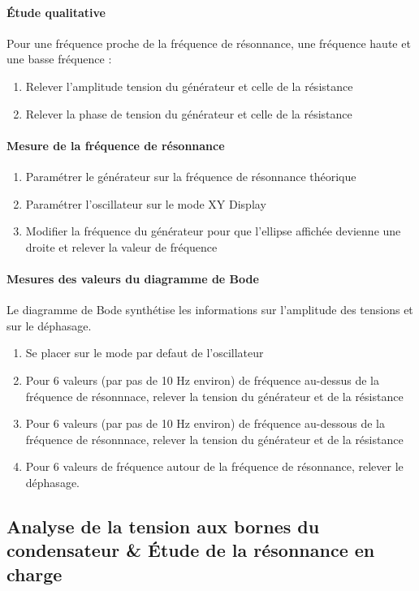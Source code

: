 \documentclass[a4paper,9pt,french]{scrartcl}
\begin{document}
\paragraph{Étude qualitative}
Pour une fréquence proche de la fréquence de résonnance, une fréquence haute et une basse fréquence :
\begin{enumerate}
\item Relever l'amplitude tension du générateur et celle de la résistance
\item Relever la phase de tension du générateur et celle de la résistance
\end{enumerate}
\paragraph{Mesure de la fréquence de résonnance}
\begin{enumerate}
\item Paramétrer le générateur sur la fréquence de résonnance théorique
\item Paramétrer l'oscillateur sur le mode XY Display
\item Modifier la fréquence du générateur pour que l'ellipse affichée devienne une droite et relever la valeur de fréquence
\end{enumerate}
\paragraph{Mesures des valeurs du diagramme de Bode}
Le diagramme de Bode synthétise les informations sur l'amplitude des tensions et sur le déphasage.
\begin{enumerate}
 \item Se placer sur le mode par defaut de l'oscillateur
 \item Pour 6 valeurs (par pas de 10 Hz environ) de fréquence au-dessus de la fréquence de résonnnace, relever la tension du générateur et de la résistance
  \item Pour 6 valeurs (par pas de 10 Hz environ) de fréquence au-dessous de la fréquence de résonnnace, relever la tension du générateur et de la résistance
  \item Pour 6 valeurs de fréquence autour de la fréquence de résonnance, relever le déphasage.
\end{enumerate}

\subsection{Analyse de la tension aux bornes du condensateur \& Étude de la résonnance en charge}
\end{document}

